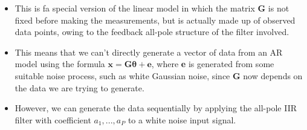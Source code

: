 \documentclass[12pt]{article}
\newcommand{\thetab}{\boldsymbol{\theta}}
\begin{document}
\begin{itemize}
        \item This is fa special version of the linear model in which the matrix \textbf{G} is not fixed before making the measurements, but is actually made up of observed data points, owing to the feedback all-pole structure of the filter involved.
        \item This means that we can't directly generate a vector of data from an AR model using the formula $\mathbf{x = G\thetab + e}$, where \textbf{e} is generated from some suitable noise process, such as white Gaussian noise, since \textbf{G} now depends on the data we are trying to generate.
        \item However, we can generate the data sequentially by applying the all-pole IIR filter with coefficient $a_1,...,a_P$ to a white noise input signal.
    \end{itemize}
\end{document}
